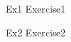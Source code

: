 \documentclass[12pt     ,
               a4paper  ,
               fleqn    ,
               twoside  ,
               numbers  = noenddot]
               {article}
\begin{document}
\pagestyle{fancy}


		    {Ex1}
		    {Exercise1}

		    {Ex2}
		    {Exercise2}

\end{document}
